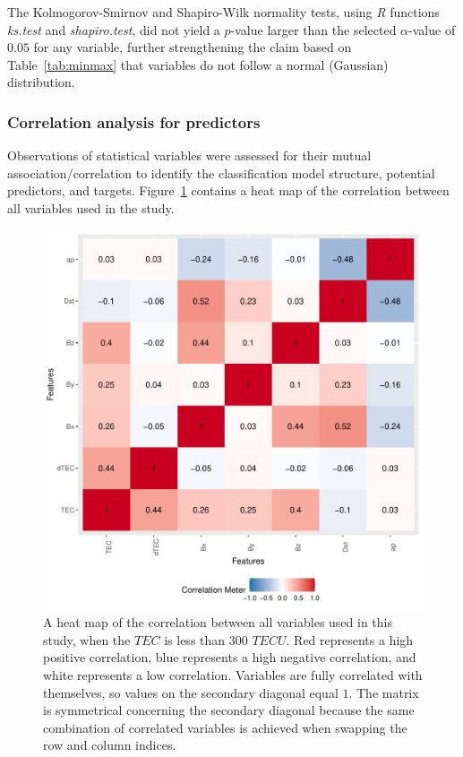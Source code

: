\let\LaTeXcline\cline\documentclass[sn-mathphys-num]{sn-jnl}\let\cline\LaTeXcline
\begin{document}
The Kolmogorov-Smirnov and Shapiro-Wilk normality tests, using \textit{R} functions \textit{ks.test} and \textit{shapiro.test}, did not yield a $p$-value larger than the selected $\alpha$-value of $0.05$ for any variable, further strengthening the claim based on Table~\ref{tab:minmax} that variables do not follow a normal (Gaussian) distribution.
  
\subsubsection{Correlation analysis for predictors}

Observations of statistical variables were assessed for their mutual association/correlation to identify the classification model structure, potential predictors, and targets. Figure~\ref{fig:correlation} contains a heat map of the correlation between all variables used in the study.

\begin{figure}[!ht]
 \centering
 \includegraphics[width=0.7\linewidth]{iono3correlation.pdf}
    \caption{A heat map of the correlation between all variables used in this study, when the $TEC$ is less than $300$ $TECU$. Red represents a high positive correlation, blue represents a high negative correlation, and white represents a low correlation. Variables are fully correlated with themselves, so values on the secondary diagonal equal $1$. The matrix is symmetrical concerning the secondary diagonal because the same combination of correlated variables is achieved when swapping the row and column indices.}
    \label{fig:correlation}
\end{figure}
\end{document}
